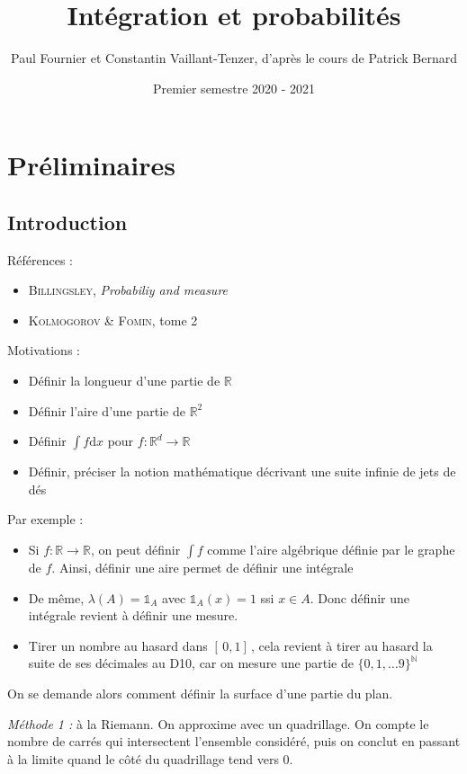 \documentclass[10pt,a4paper,notitlepage ]{report}
\title{Intégration et probabilités}
\date{Premier semestre 2020 - 2021}
\author{Paul Fournier et Constantin Vaillant-Tenzer, d'après le cours de Patrick Bernard}
\begin{document}
	\maketitle
	
	\tableofcontents
	
\chapter{Préliminaires}

\section{Introduction}
	Références : 
	\begin{itemize}
		\item \textsc{Billingsley}, \textit{Probabiliy and measure}
		\item \textsc{Kolmogorov \& Fomin}, tome 2 
	\end{itemize}
	Motivations :
	\begin{itemize}
		\item Définir la longueur d'une partie de $\mathbb R$
		\item Définir l'aire d'une partie de $\mathbb R ^2$
		\item  Définir $\int f \mathrm dx$ pour $f : \mathbb R ^d \rightarrow \mathbb R$
		\item Définir, préciser la notion mathématique décrivant une suite infinie de jets de dés
	\end{itemize}
Par exemple :
\begin{itemize}
	\item Si $f : \mathbb R \rightarrow \mathbb R$, on peut définir $\int f$ comme l'aire algébrique définie par le graphe de $f$. Ainsi, définir une aire permet de définir une intégrale
	\item De même, $\lambda(A) = \mathds 1_A$ avec $\mathds 1_A(x)=1$ ssi $x \in A$. Donc définir une intégrale revient à définir une mesure.
	\item Tirer un nombre au hasard dans $[\,0,1]\,$, cela revient à tirer au hasard la suite de ses décimales au D10, car on mesure une partie de $\{ 0, 1, \dots 9 \}^\mathbb N$
 \end{itemize}

On se demande alors comment définir la surface d'une partie du plan.

\emph{Méthode 1 :} à la Riemann. On approxime avec un quadrillage. On compte le nombre de carrés qui intersectent l'ensemble considéré, puis on conclut en passant à la limite quand le côté du quadrillage tend vers $0$.
\end{document}
